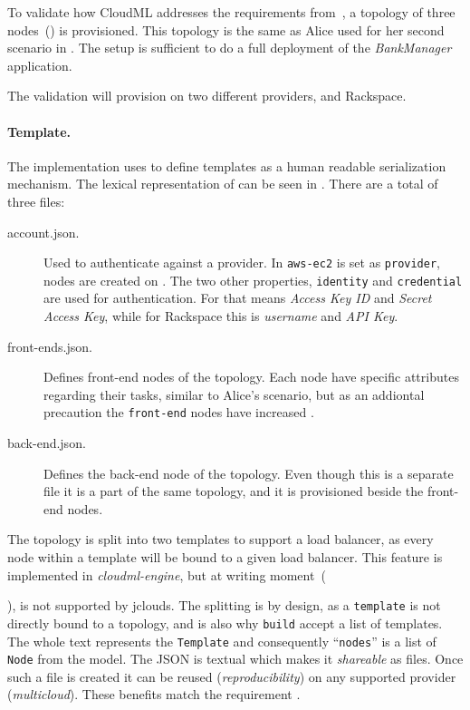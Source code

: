 
To validate how CloudML addresses the requirements from~,
a topology of three nodes~() is provisioned.
This topology is the same as Alice used for her second scenario in .
The setup is sufficient to do a full deployment of the \emph{BankManager} application.

The validation will provision on two different providers,  and Rackspace.

\paragraph{Template.}


The implementation uses  to define templates as a human readable serialization mechanism.
The lexical representation of  can be seen in . 
There are a total of three files:
\begin{description}
  \item[account.json.]
    Used to authenticate against a provider.
    In  \texttt{aws-ec2} is set as \texttt{provider},
    \ie nodes are created on .
    The two other properties, \texttt{identity} and \texttt{credential} are used for authentication.
    For  that means \emph{Access Key ID} and \emph{Secret Access Key},
    while for Rackspace this is \emph{username} and \emph{API Key}.
  \item[front-ends.json.]
    Defines front-end nodes of the topology.
    Each node have specific attributes regarding their tasks, similar to Alice's scenario,
    but as an addiontal precaution the \texttt{front-end} nodes have increased .
  \item[back-end.json.]
    Defines the back-end node of the topology.
    Even though this is a separate file it is a part of the same topology,
    and it is provisioned beside the front-end nodes.
\end{description}
The topology is split into two templates to support a load balancer,
as every node within a template will be bound to a given load balancer.
This feature is implemented in \emph{cloudml-engine}, but at writing moment~(\date{April 2012}),
is not supported by jclouds.
The splitting is by design, as a \texttt{template} is not directly bound to a topology,
and is also why \texttt{build} accept a list of templates.
The whole text represents the \texttt{Template} and consequently 
``\texttt{nodes}'' is a list of \texttt{Node} from the model.
The JSON is textual which makes it \emph{shareable} as files.
Once such a file is created it can be reused (\emph{reproducibility}) 
on any supported provider (\emph{multicloud}).
These benefits match the requirement .

